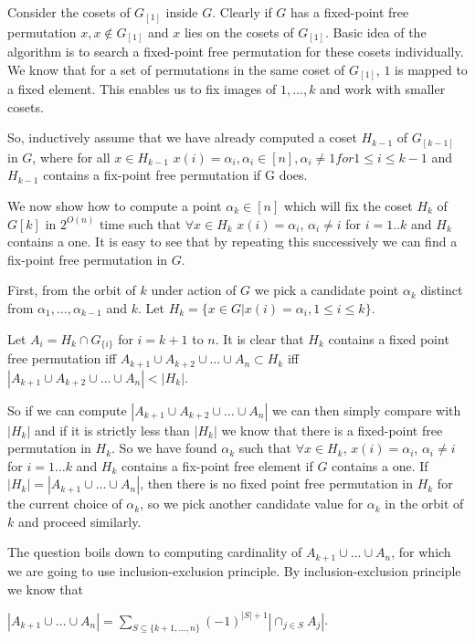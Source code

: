 \documentclass[12pt]{report}
\begin{document}
Consider the cosets of $G_{[1]}$ inside $G$. Clearly if $G$ has a fixed-point free permutation $x, x \notin G_{[1]}$ and $x$ lies on the cosets of $G_{[1]}$. Basic idea of the algorithm is to search a fixed-point free permutation for these cosets individually. We know that for a set of permutations in the same coset of $G_{[1]}$, $1$ is mapped to a fixed element. This enables us to fix images of $1, \dots, k$ and work with smaller cosets.

So, inductively assume that we have already computed a coset $H_{k-1}$ of $G_{[k-1]}$ in $G$, where for all $x \in H_{k-1}$ $x(i) = \alpha_i, \alpha_i \in [n], \alpha_i \neq 1 for 1 \leq i \leq k-1$ and $H_{k-1}$ contains a fix-point free permutation if G does.

We now show how to compute a point $\alpha_k \in [n]$ which will fix the coset $H_k$ of $G[k]$ in $2^{O(n)}$ time such that $\forall x \in H_k$ $x(i) = \alpha_i$, $\alpha_i \neq i$ for $i = 1 .. k$ and $H_k$ contains a one. It is easy to see that by repeating this successively we can find a fix-point free permutation in $G$.

First, from the orbit of $k$ under action of $G$ we pick a candidate point $\alpha_k$ distinct from $\alpha_1, \dots, \alpha_{k-1}$ and $k$. Let $H_k = \{x \in G | x(i) = \alpha_i, 1 \leq i \leq k\}$.

Let $A_i = H_k \cap G_{\{i\}}$ for $i = k + 1$ to $n$. It is clear that $H_k$ contains a fixed point free permutation iff $A_{k+1} \cup A_{k+2} \cup \dots \cup A_n \subset H_k$ iff $|A_{k+1} \cup A_{k+2} \cup \dots \cup A_n| < |H_k|$.

So if we can compute $|A_{k+1} \cup A_{k+2} \cup \dots \cup A_n|$ we can then simply compare with $|H_k|$ and if it is strictly less than $|H_k|$ we know that there is a fixed-point free permutation in $H_k$. So we have found $\alpha_k$ such that $\forall x \in H_k$, $x(i) = \alpha_i$, $\alpha_i \neq i$ for $i = 1 \dots k$ and $H_k$ contains a fix-point free element if $G$ contains a one. If $|H_k| = |A_{k+1} \cup \dots \cup A_n|$, then there is no fixed point free permutation in $H_k$ for the current choice of $\alpha_k$, so we pick another candidate value for $\alpha_k$ in the orbit of $k$ and proceed similarly.

The question boils down to computing cardinality of $A_{k+1} \cup \dots \cup A_n$, for which we are going to use inclusion-exclusion principle. By inclusion-exclusion principle we know that

\begin{center}
	$|A_{k+1} \cup \dots \cup A_n| = \sum\limits_{S \subseteq \{k+1, \dots, n\}} (-1)^{|S| + 1} |\cap_{j \in S} A_j|$.
\end{center}
\end{document}
